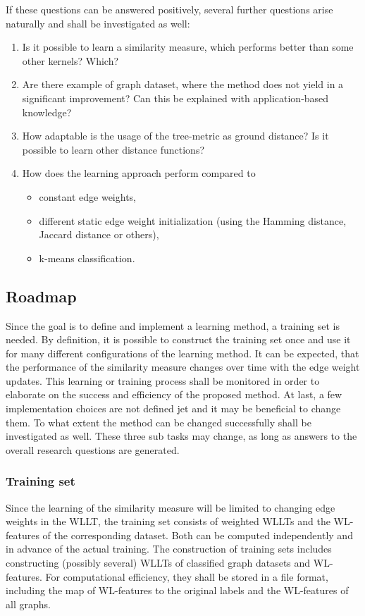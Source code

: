 If these questions can be answered positively, several further questions arise naturally and shall be investigated as well:
\begin{enumerate}
	\item Is it possible to learn a similarity measure, which performs better than some other kernels? Which?
	\item Are there example of graph dataset, where the method does not yield in a significant improvement? Can this be explained with application-based knowledge?
	\item How adaptable is the usage of the tree-metric as ground distance? Is it possible to learn other distance functions?
	\item How does the learning approach perform compared to \begin{itemize}
		\item constant edge weights,
		\item different static edge weight initialization (using the Hamming distance, Jaccard distance or others),
		\item k-means classification.
	\end{itemize}
\end{enumerate} 

\subsection{Roadmap}

Since the goal is to define and implement a learning method, a training set is needed. 
By definition, it is possible to construct the training set once and use it for many different configurations of the learning method.
It can be expected, that the performance of the similarity measure changes over time with the edge weight updates. 
This learning or training process shall be monitored in order to elaborate on the success and efficiency of the proposed method.
At last, a few implementation choices are not defined jet and it may be beneficial to change them. 
To what extent the method can be changed successfully shall be investigated as well.
These three sub tasks may change, as long as answers to the overall research questions are generated.

\subsubsection{Training set}

Since the learning of the similarity measure will be limited to changing edge weights in the WLLT, the training set consists of weighted WLLTs and the WL-features of the corresponding dataset.
Both can be computed independently and in advance of the actual training.
The construction of training sets includes constructing (possibly several) WLLTs of classified graph datasets and WL-features.
For computational efficiency, they shall be stored in a file format, including the map of WL-features to the original labels and the WL-features of all graphs.

